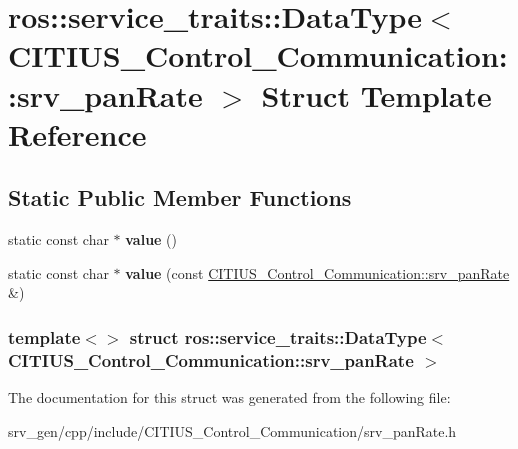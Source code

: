 \hypertarget{structros_1_1service__traits_1_1_data_type_3_01_c_i_t_i_u_s___control___communication_1_1srv__pan_rate_01_4}{\section{ros\-:\-:service\-\_\-traits\-:\-:\-Data\-Type$<$ \-C\-I\-T\-I\-U\-S\-\_\-\-Control\-\_\-\-Communication\-:\-:srv\-\_\-pan\-Rate $>$ \-Struct \-Template \-Reference}
\label{structros_1_1service__traits_1_1_data_type_3_01_c_i_t_i_u_s___control___communication_1_1srv__pan_rate_01_4}
}
\subsection*{\-Static \-Public \-Member \-Functions}
\begin{DoxyCompactItemize}
\item 
\hypertarget{structros_1_1service__traits_1_1_data_type_3_01_c_i_t_i_u_s___control___communication_1_1srv__pan_rate_01_4_a2fa16a2b1bac8b0e6338e5a65ba7f6b8}{static const char $\ast$ {\bfseries value} ()}\label{structros_1_1service__traits_1_1_data_type_3_01_c_i_t_i_u_s___control___communication_1_1srv__pan_rate_01_4_a2fa16a2b1bac8b0e6338e5a65ba7f6b8}

\item 
\hypertarget{structros_1_1service__traits_1_1_data_type_3_01_c_i_t_i_u_s___control___communication_1_1srv__pan_rate_01_4_a68fb332f805ee2d1ffea53f8d400f2c5}{static const char $\ast$ {\bfseries value} (const \hyperlink{struct_c_i_t_i_u_s___control___communication_1_1srv__pan_rate}{\-C\-I\-T\-I\-U\-S\-\_\-\-Control\-\_\-\-Communication\-::srv\-\_\-pan\-Rate} \&)}\label{structros_1_1service__traits_1_1_data_type_3_01_c_i_t_i_u_s___control___communication_1_1srv__pan_rate_01_4_a68fb332f805ee2d1ffea53f8d400f2c5}

\end{DoxyCompactItemize}
\subsubsection*{template$<$$>$ struct ros\-::service\-\_\-traits\-::\-Data\-Type$<$ C\-I\-T\-I\-U\-S\-\_\-\-Control\-\_\-\-Communication\-::srv\-\_\-pan\-Rate $>$}



\-The documentation for this struct was generated from the following file\-:\begin{DoxyCompactItemize}
\item 
srv\-\_\-gen/cpp/include/\-C\-I\-T\-I\-U\-S\-\_\-\-Control\-\_\-\-Communication/srv\-\_\-pan\-Rate.\-h\end{DoxyCompactItemize}

